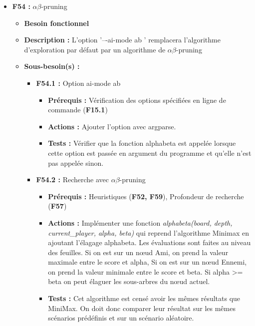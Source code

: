 \documentclass{article}
\begin{document}
\begin{itemize}
\begin{itemize}
    \end{itemize}
\bigskip
    \item \label{alphabeta} \textbf{F54 :} $\alpha\beta$-pruning
    \begin{itemize}
        \item \textbf{Besoin fonctionnel}
        \item \textbf{Description :} L’option ’–-ai-mode ab ’ remplacera l’algorithme d’exploration par défaut par un algorithme de $\alpha\beta$-pruning
        \item \textbf{Sous-besoin(s) :}
        \begin{itemize}
            \smallskip
            \item  \textbf{F54.1 :} Option ai-mode ab
            \begin{itemize}
                \item \textbf{Prérequis :} Vérification des options spécifiées en ligne de commande (\textbf{F15.1})
                \item \textbf{Actions :} Ajouter l’option avec argparse.
                \item \textbf{Tests :} Vérifier que la fonction alphabeta est appelée lorsque cette option est passée en argument du programme et qu’elle n’est pas appelée sinon.
            \end{itemize}
            \smallskip
            \item \textbf{F54.2 :} Recherche avec $\alpha\beta$-pruning
            \begin{itemize}
                \item \textbf{Prérequis :} Heuristiques (\textbf{F52, F59}), Profondeur de recherche (\textbf{F57})
                \item \textbf{Actions :} Implémenter une fonction \textit{alphabeta(board, depth, current\_player, alpha, beta)} qui reprend l’algorithme Minimax en ajoutant l’élagage alphabeta. Les évaluations sont faites au niveau des feuilles. Si on est sur un nœud Ami, on prend la valeur maximale entre le score et alpha, Si on est sur un nœud Ennemi, on prend la valeur minimale entre le score et beta. Si alpha >= beta on peut élaguer les sous-arbres du nœud actuel.
                \item \textbf{Tests :} Cet algorithme est censé avoir les mêmes résultats que MiniMax. On doit donc comparer leur résultat sur les mêmes scénarios prédéfinis et sur un scénario aléatoire.
            \end{itemize}
        \end{itemize}

\end{itemize}
\end{itemize}
\end{document}
